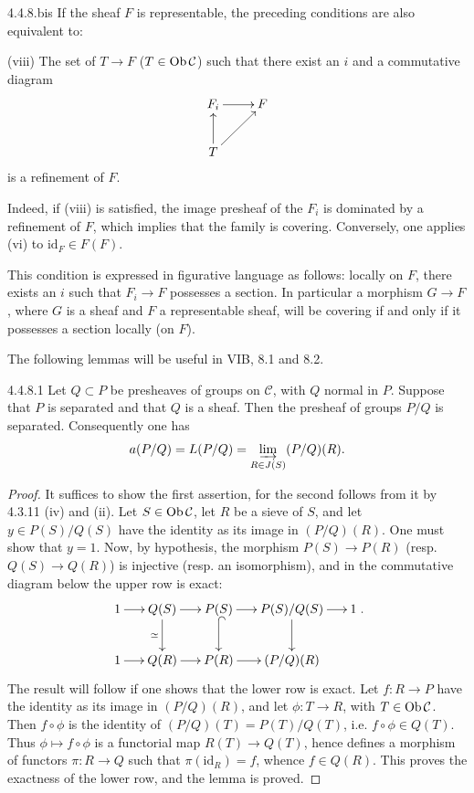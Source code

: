 \begin{remark}{4.4.8.bis}\label{IV.4.4.8.bis}
If the sheaf \(F\) is representable, the preceding conditions
are also equivalent to:

(viii) The set of \(T\to F\) (\(T\in\operatorname{Ob}\mathcal C\)) such that
there exist an \(i\) and a commutative diagram
\[
\xymatrix{F_i\ar[r] & F\\ T\ar[u]\ar[ur] & }
\]
is a refinement of \(F\).

Indeed, if (viii) is satisfied, the image presheaf of the \(F_i\)
is dominated by a refinement of \(F\),
which implies that the family is covering.
Conversely, one applies (vi) to \(\mathrm{id}_F\in F(F)\).

This condition is expressed in figurative language as follows:
locally on \(F\), there exists an \(i\) such that \(F_i\to F\)
possesses a section. In particular a morphism \(G\to F\), where
\(G\) is a sheaf and \(F\) a representable sheaf, will be covering
if and only if it possesses a section locally (on \(F\)).
\end{remark}

The following lemmas will be useful in VIB, 8.1 and 8.2.

\begin{lemma}{4.4.8.1}\label{IV.4.4.8.1}
Let \(Q\subset P\) be presheaves of groups on \(\mathcal C\),
with \(Q\) normal in \(P\). Suppose that \(P\) is separated
and that \(Q\) is a sheaf. Then the presheaf of groups \(P/Q\)
is separated. Consequently one has
\[
a(P/Q)=L(P/Q)=\varinjlim_{R\in J(S)}(P/Q)(R).
\]
\end{lemma}
\begin{proof}
It suffices to show the first assertion, for the second follows
from it by 4.3.11 (iv) and (ii).
Let \(S\in\operatorname{Ob}\mathcal C\), let \(R\) be a sieve of \(S\), and
let \(y\in P(S)/Q(S)\) have the identity as its image in \((P/Q)(R)\).
One must show that \(y=1\). Now, by hypothesis, the morphism
\(P(S)\to P(R)\) (resp. \(Q(S)\to Q(R)\)) is injective
(resp. an isomorphism), and in the commutative diagram below
the upper row is exact:
\[
\xymatrix@C=1.5em{
1\ar[r] & Q(S)\ar[r]\ar[d]_{\simeq} & P(S)\ar[r]\ar@{^{(}->}[d]
 & P(S)/Q(S)\ar[r]\ar[d] & 1\\
1\ar[r] & Q(R)\ar[r] & P(R)\ar[r] & (P/Q)(R) & }.
\]
The result will follow if one shows that the lower row is exact.
Let \(f:R\to P\) have the identity as its image in \((P/Q)(R)\),
and let \(\phi:T\to R\), with \(T\in\operatorname{Ob}\mathcal C\).
Then \(f\circ\phi\) is the identity of
\((P/Q)(T)=P(T)/Q(T)\), i.e. \(f\circ\phi\in Q(T)\).
Thus \(\phi\mapsto f\circ\phi\) is a functorial map
\(R(T)\to Q(T)\), hence defines a morphism of functors
\(\pi:R\to Q\) such that \(\pi(\mathrm{id}_R)=f\), whence \(f\in Q(R)\).
This proves the exactness of the lower row, and the lemma is proved.
\end{proof}

